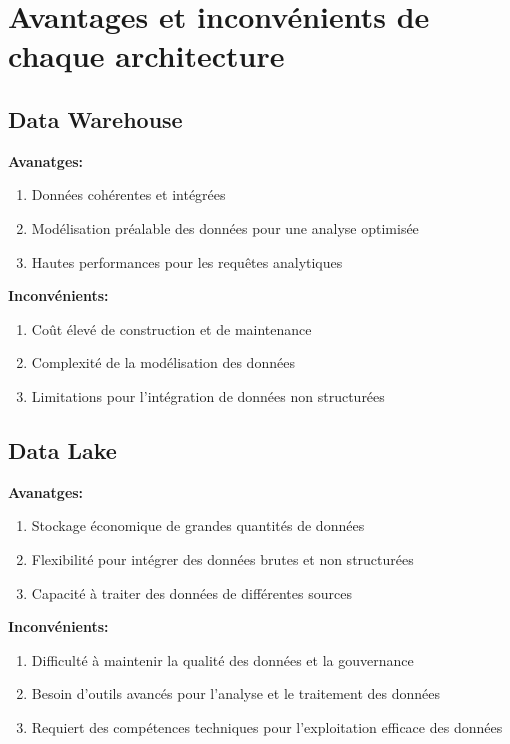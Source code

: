 \section{Avantages et inconvénients de chaque architecture}

\subsection{Data Warehouse}
\textbf{Avanatges:}
\begin{enumerate}
    \item Données cohérentes et intégrées
    \item Modélisation préalable des données pour une analyse optimisée
    \item Hautes performances pour les requêtes analytiques
\end{enumerate}

\textbf{Inconvénients:}
\begin{enumerate}
    \item Coût élevé de construction et de maintenance
    \item Complexité de la modélisation des données
    \item Limitations pour l'intégration de données non structurées
\end{enumerate}


\subsection{Data Lake}
\textbf{Avanatges:}
\begin{enumerate}
    \item Stockage économique de grandes quantités de données
    \item Flexibilité pour intégrer des données brutes et non structurées
    \item Capacité à traiter des données de différentes sources
\end{enumerate}

\textbf{Inconvénients:}
\begin{enumerate}
    \item Difficulté à maintenir la qualité des données et la gouvernance
    \item Besoin d'outils avancés pour l'analyse et le traitement des données
    \item Requiert des compétences techniques pour l'exploitation efficace des données
\end{enumerate}

